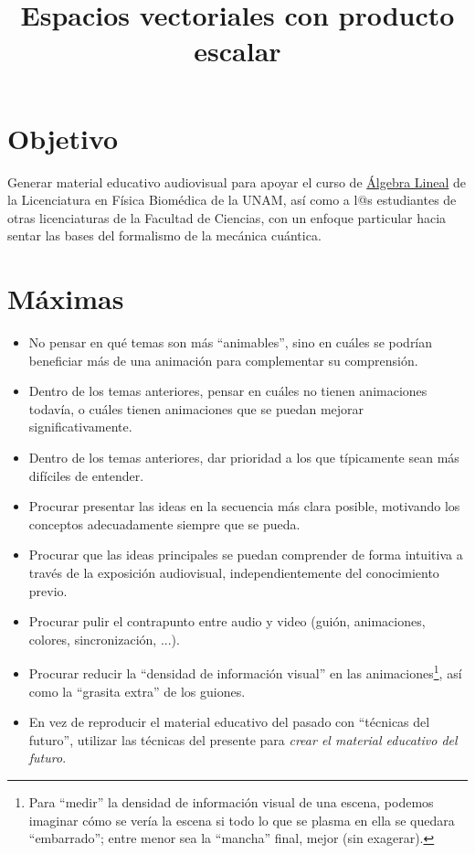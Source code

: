 \documentclass[12pt,dvipsnames]{article}
\numberwithin{equation}{section}
\begin{document}
\title{Espacios vectoriales con producto escalar}
\date{}
\maketitle

\section{Objetivo}
Generar material educativo audiovisual para apoyar el curso de \href{http://www.fciencias.unam.mx/licenciatura/asignaturas/2016/1330}{Álgebra Lineal} de la Licenciatura en Física Biomédica de la UNAM, así como a l@s estudiantes de otras licenciaturas de la Facultad de Ciencias, con un enfoque particular hacia sentar las bases del formalismo de la mecánica cuántica.

\section{Máximas}

\begin{itemize}
    \item No pensar en qué temas son más ``animables'', sino en cuáles se podrían beneficiar más de una animación para complementar su comprensión.
    \item Dentro de los temas anteriores, pensar en cuáles no tienen animaciones todavía, o cuáles tienen animaciones que se puedan mejorar significativamente.
    \item Dentro de los temas anteriores, dar prioridad a los que típicamente sean más difíciles de entender.
    \item Procurar presentar las ideas en la secuencia más clara posible, motivando los conceptos adecuadamente siempre que se pueda.
    \item Procurar que las ideas principales se puedan comprender de forma intuitiva a través de la exposición audiovisual, independientemente del conocimiento previo.
    \item Procurar pulir el contrapunto entre audio y video (guión, animaciones, colores, sincronización, ...).
    \item Procurar reducir la ``densidad de información visual'' en las animaciones\footnote{Para ``medir'' la densidad de información visual de una escena, podemos imaginar cómo se vería la escena si todo lo que se plasma en ella se quedara ``embarrado''; entre menor sea la ``mancha'' final, mejor (sin exagerar).}, así como la ``grasita extra'' de los guiones.
    \item En vez de reproducir el material educativo del pasado con ``técnicas del futuro'', utilizar las técnicas del presente para \emph{crear el material educativo del futuro}.
\end{itemize}
\end{document}

